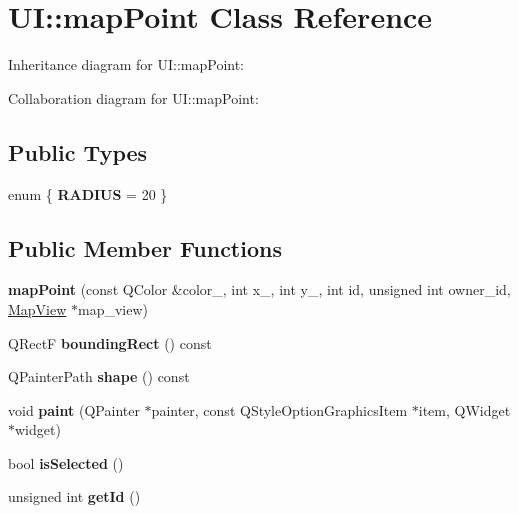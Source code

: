 \hypertarget{classUI_1_1mapPoint}{}\section{UI\+:\+:map\+Point Class Reference}
\label{classUI_1_1mapPoint}


Inheritance diagram for UI\+:\+:map\+Point\+:


Collaboration diagram for UI\+:\+:map\+Point\+:
\subsection*{Public Types}
\begin{DoxyCompactItemize}
\item 
enum \{ {\bfseries R\+A\+D\+I\+US} = 20
 \}\hypertarget{classUI_1_1mapPoint_ac059b7948240a92b371d67e73f676311}{}\label{classUI_1_1mapPoint_ac059b7948240a92b371d67e73f676311}

\end{DoxyCompactItemize}
\subsection*{Public Member Functions}
\begin{DoxyCompactItemize}
\item 
{\bfseries map\+Point} (const Q\+Color \&color\+\_\+, int x\+\_\+, int y\+\_\+, int id, unsigned int owner\+\_\+id, \hyperlink{classMapView}{Map\+View} $\ast$map\+\_\+view)\hypertarget{classUI_1_1mapPoint_a39e9bdbac72f2cc1d51516b074e33ada}{}\label{classUI_1_1mapPoint_a39e9bdbac72f2cc1d51516b074e33ada}

\item 
Q\+RectF {\bfseries bounding\+Rect} () const \hypertarget{classUI_1_1mapPoint_abe62a9d3c4bf067548532490ec33169f}{}\label{classUI_1_1mapPoint_abe62a9d3c4bf067548532490ec33169f}

\item 
Q\+Painter\+Path {\bfseries shape} () const \hypertarget{classUI_1_1mapPoint_aedd92acdd2b1badf96eef4e55d9833a0}{}\label{classUI_1_1mapPoint_aedd92acdd2b1badf96eef4e55d9833a0}

\item 
void {\bfseries paint} (Q\+Painter $\ast$painter, const Q\+Style\+Option\+Graphics\+Item $\ast$item, Q\+Widget $\ast$widget)\hypertarget{classUI_1_1mapPoint_af18dfb7f66d4b3a7fea4d1072d9ce2e4}{}\label{classUI_1_1mapPoint_af18dfb7f66d4b3a7fea4d1072d9ce2e4}

\item 
bool {\bfseries is\+Selected} ()\hypertarget{classUI_1_1mapPoint_a50b09740f4c4ab14137e02c814cdde19}{}\label{classUI_1_1mapPoint_a50b09740f4c4ab14137e02c814cdde19}

\item 
unsigned int {\bfseries get\+Id} ()\hypertarget{classUI_1_1mapPoint_ad394a112255b51d0f8fd2404e4a5dd86}{}\label{classUI_1_1mapPoint_ad394a112255b51d0f8fd2404e4a5dd86}

\end{DoxyCompactItemize}
